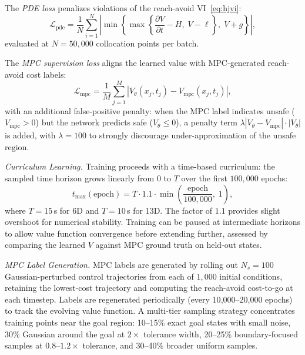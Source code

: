 \documentclass[letterpaper, 10 pt, conference]{ieeeconf}
\begin{document}
The \emph{PDE loss} penalizes violations of the reach-avoid VI~\eqref{eq:hjvi}:
\begin{equation}\label{eq:pde_loss}
\mathcal{L}_{\mathrm{pde}} = \frac{1}{N}\sum_{i=1}^{N} \left| \min\!\left\{\max\!\left\{\frac{\partial V}{\partial t} - H,\; V - \ell\right\},\; V + g\right\}\right|,
\end{equation}
evaluated at $N = 50{,}000$ collocation points per batch.

The \emph{MPC supervision loss} aligns the learned value with MPC-generated reach-avoid cost labels:
\begin{equation}\label{eq:mpc_loss}
\mathcal{L}_{\mathrm{mpc}} = \frac{1}{M}\sum_{j=1}^{M} |V_\theta(x_j, t_j) - V_{\mathrm{mpc}}(x_j, t_j)|,
\end{equation}
with an additional false-positive penalty: when the MPC label indicates unsafe ($V_{\mathrm{mpc}} > 0$) but the network predicts safe ($V_\theta \leq 0$), a penalty term $\lambda |V_\theta - V_{\mathrm{mpc}}| \cdot |V_\theta|$ is added, with $\lambda = 100$ to strongly discourage under-approximation of the unsafe region.

\textit{Curriculum Learning.}
Training proceeds with a time-based curriculum: the sampled time horizon grows linearly from $0$ to $T$ over the first $100{,}000$ epochs:
\begin{equation}\label{eq:curriculum}
t_{\max}(\text{epoch}) = T \cdot 1.1 \cdot \min\!\left(\frac{\text{epoch}}{100{,}000},\; 1\right)\!,
\end{equation}
where $T = 15$\,s for 6D and $T = 10$\,s for 13D. The factor of $1.1$ provides slight overshoot for numerical stability. Training can be paused at intermediate horizons to allow value function convergence before extending further, assessed by comparing the learned $V$ against MPC ground truth on held-out states.

\textit{MPC Label Generation.}
MPC labels are generated by rolling out $N_s = 100$ Gaussian-perturbed control trajectories from each of $1{,}000$ initial conditions, retaining the lowest-cost trajectory and computing the reach-avoid cost-to-go at each timestep. Labels are regenerated periodically (every 10{,}000--20{,}000 epochs) to track the evolving value function. A multi-tier sampling strategy concentrates training points near the goal region: 10--15\% exact goal states with small noise, 30\% Gaussian around the goal at $2\times$ tolerance width, 20--25\% boundary-focused samples at $0.8$--$1.2\times$ tolerance, and 30--40\% broader uniform samples.
\end{document}
